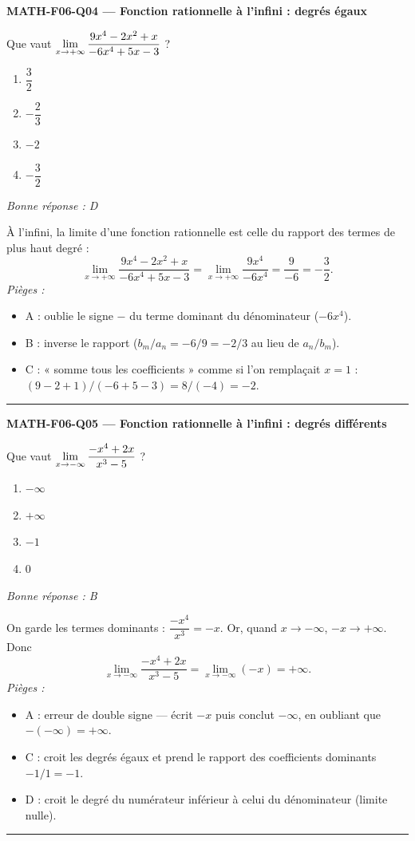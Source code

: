 \documentclass[11pt,a4paper]{article}
\begin{document}
\noindent\textbf{MATH-F06-Q04 --- Fonction rationnelle à l'infini : degrés égaux}\par
Que vaut $\displaystyle\lim_{x\to +\infty}\frac{9x^{4}-2x^{2}+x}{-6x^{4}+5x-3}$ ?
\begin{enumerate}[label=\Alph*)]
\item $\dfrac{3}{2}$
\item $-\dfrac{2}{3}$
\item $-2$
\item $-\dfrac{3}{2}$
\end{enumerate}
\textit{Bonne réponse : D}\par
À l'infini, la limite d'une fonction rationnelle est celle du rapport des termes de plus haut degré :
\[ \lim_{x\to +\infty}\frac{9x^{4}-2x^{2}+x}{-6x^{4}+5x-3}=\lim_{x\to +\infty}\frac{9x^{4}}{-6x^{4}}=\frac{9}{-6}=-\frac{3}{2}. \]
\textit{Pièges :}
\begin{itemize}
\item A : oublie le signe $-$ du terme dominant du dénominateur ($-6x^{4}$).
\item B : inverse le rapport ($b_m/a_n=-6/9=-2/3$ au lieu de $a_n/b_m$).
\item C : « somme tous les coefficients » comme si l'on remplaçait $x=1$ : $(9-2+1)/(-6+5-3)=8/(-4)=-2$.
\end{itemize}
\vspace{8pt}\hrule\vspace{8pt}

\noindent\textbf{MATH-F06-Q05 --- Fonction rationnelle à l'infini : degrés différents}\par
Que vaut $\displaystyle\lim_{x\to -\infty}\frac{-x^{4}+2x}{x^{3}-5}$ ?
\begin{enumerate}[label=\Alph*)]
\item $-\infty$
\item $+\infty$
\item $-1$
\item $0$
\end{enumerate}
\textit{Bonne réponse : B}\par
On garde les termes dominants : $\dfrac{-x^{4}}{x^{3}}=-x$. Or, quand $x\to -\infty$, $-x\to +\infty$. Donc
\[ \lim_{x\to -\infty}\frac{-x^{4}+2x}{x^{3}-5}=\lim_{x\to -\infty}(-x)=+\infty. \]
\textit{Pièges :}
\begin{itemize}
\item A : erreur de double signe --- écrit $-x$ puis conclut $-\infty$, en oubliant que $-(-\infty)=+\infty$.
\item C : croit les degrés égaux et prend le rapport des coefficients dominants $-1/1=-1$.
\item D : croit le degré du numérateur inférieur à celui du dénominateur (limite nulle).
\end{itemize}
\vspace{8pt}\hrule\vspace{8pt}
\end{document}
